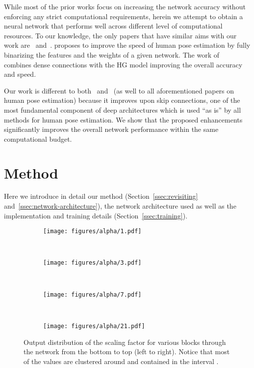 \documentclass[a4paper, 10pt, conference]{ieeeconf}      \usepackage{FG2020}
\begin{document}
While most of the prior works focus on increasing the network accuracy without enforcing any strict computational requirements, herein we attempt to obtain a neural network that performs well across different level of computational resources. To our knowledge, the only papers that have similar aims with our work are~\cite{bulat2017binarized}  and~\cite{tang2018cu}.
\cite{bulat2017binarized} proposes to improve the speed of human pose estimation by fully binarizing the features and the weights of a given network. The work of~\cite{tang2018cu} combines dense connections with the HG model improving the overall accuracy and speed. 

Our work is different to both~\cite{bulat2017binarized}  and~\cite{tang2018cu} (as well to all aforementioned papers on human pose estimation) because it improves upon skip connections, one of the most fundamental component of deep architectures which is used ``as is'' by all methods for human pose estimation. We show that the proposed enhancements significantly improves the overall network performance within the same computational budget.
 \section{Method}\label{sec:method}
Here we introduce in detail our method (Section~\ref{ssec:revisiting} and~\ref{ssec:network-architecture}), the network architecture used as well as the implementation and training details (Section~\ref{ssec:training}).
\begin{figure*}[!htbp]
    \begin{subfigure}[t]{0.23\textwidth}
    \centering
    \texttt{[image: figures/alpha/1.pdf]}
    \end{subfigure}
    ~
    \begin{subfigure}[t]{0.23\textwidth}
    \centering
    \texttt{[image: figures/alpha/3.pdf]}
    \end{subfigure}
    ~
    \begin{subfigure}[t]{0.23\textwidth}
    \centering
    \texttt{[image: figures/alpha/7.pdf]}
    \end{subfigure}
    ~
    \begin{subfigure}[t]{0.23\textwidth}
    \centering
    \texttt{[image: figures/alpha/21.pdf]}
    \end{subfigure}

    \caption{Output distribution of the scaling factor  for various blocks through the network from the bottom to top (left to right). Notice that most of the values are clustered around  and contained in the interval .}
    \label{fig:alpha-distribution}
\end{figure*}
\end{document}
